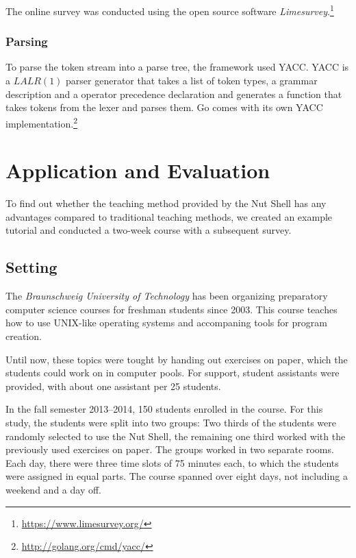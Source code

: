 \documentclass[paper=a4,twoside,abstract=on,cleardoublepage=empty,numbers=noenddot,toc=bib,12pt,appendixprefix=true]{scrreprt}
\begin{document}
The online survey was conducted using the open source software \emph{Limesurvey}.\footnote{\url{https://www.limesurvey.org/}}

\subsection*{Parsing}

To parse the token stream into a parse tree, the framework used \textsc{YACC}. \textsc{YACC} is a $LALR(1)$ parser generator that takes a list of token types, a grammar description and a operator precedence declaration and generates a function that takes tokens from the lexer and parses them. Go comes with its own YACC implementation.\footnote{\url{http://golang.org/cmd/yacc/}}


\chapter{Application and Evaluation}
\label{sec:evaluation}

To find out whether the teaching method provided by the Nut Shell has any advantages compared to traditional teaching methods, we created an example tutorial and conducted a two-week course with a subsequent survey.

\section{Setting}

The \textit{Braunschweig University of Technology} has been organizing preparatory computer science courses for freshman students since 2003. This course teaches how to use UNIX-like operating systems and accompaning tools for program creation.

Until now, these topics were tought by handing out exercises on paper, which the students could work on in computer pools. For support, student assistants were provided, with about one assistant per 25 students.

In the fall semester 2013--2014, 150 students enrolled in the course. For this study, the students were split into two groups: Two thirds of the students were randomly selected to use the Nut Shell, the remaining one third worked with the previously used exercises on paper. The groups worked in two separate rooms. Each day, there were three time slots of 75 minutes each, to which the students were assigned in equal parts. The course spanned over eight days, not including a weekend and a day off.
\end{document}
